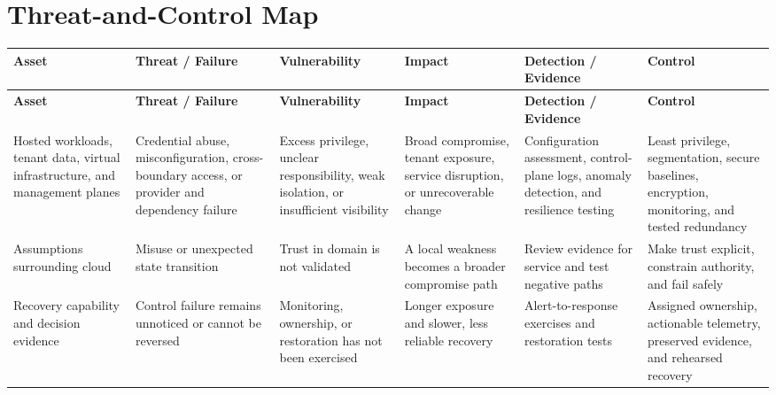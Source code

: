 \documentclass[11pt,letterpaper]{article}
\begin{document}
\section*{Threat-and-Control Map}
\begingroup\scriptsize\setlength{\tabcolsep}{2pt}
\begin{longtable}{>{\raggedright\arraybackslash}p{}>{\raggedright\arraybackslash}p{}>{\raggedright\arraybackslash}p{}>{\raggedright\arraybackslash}p{}>{\raggedright\arraybackslash}p{}>{\raggedright\arraybackslash}p{}}
\toprule\rowcolor{Navy}\color{white}\textbf{Asset} & \color{white}\textbf{Threat / Failure} & \color{white}\textbf{Vulnerability} & \color{white}\textbf{Impact} & \color{white}\textbf{Detection / Evidence} & \color{white}\textbf{Control}\\\midrule
\endfirsthead
\toprule\rowcolor{Navy}\color{white}\textbf{Asset} & \color{white}\textbf{Threat / Failure} & \color{white}\textbf{Vulnerability} & \color{white}\textbf{Impact} & \color{white}\textbf{Detection / Evidence} & \color{white}\textbf{Control}\\\midrule
\endhead
Hosted workloads, tenant data, virtual infrastructure, and management planes & Credential abuse, misconfiguration, cross-boundary access, or provider and dependency failure & Excess privilege, unclear responsibility, weak isolation, or insufficient visibility & Broad compromise, tenant exposure, service disruption, or unrecoverable change & Configuration assessment, control-plane logs, anomaly detection, and resilience testing & Least privilege, segmentation, secure baselines, encryption, monitoring, and tested redundancy\\\midrule
Assumptions surrounding cloud & Misuse or unexpected state transition & Trust in domain is not validated & A local weakness becomes a broader compromise path & Review evidence for service and test negative paths & Make trust explicit, constrain authority, and fail safely\\\midrule
Recovery capability and decision evidence & Control failure remains unnoticed or cannot be reversed & Monitoring, ownership, or restoration has not been exercised & Longer exposure and slower, less reliable recovery & Alert-to-response exercises and restoration tests & Assigned ownership, actionable telemetry, preserved evidence, and rehearsed recovery\\\midrule
\bottomrule
\end{longtable}
\endgroup
\end{document}
